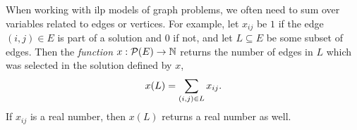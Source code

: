 When working with \gls{ilp} models of graph problems, we often need to sum over variables
related to edges or vertices. For example, let $x_{ij}$ be $1$ if the edge $(i,j) \in E$
is part of a solution and $0$ if not, and let $L \subseteq E$ be some subset of edges.
Then the \textit{function} $x : \mathcal{P} (E) \to \mathbb{N}$ returns the number of edges
 in $L$ which was selected in the solution defined by $x$,
 \[x(L) = \sum_{(i, j) \in L} x_{ij}\mathnormal{.}\]
 If $x_{ij}$ is a real number, then $x(L)$ returns a real number as well.

\clearpage
\glsaddall
\printglossaries

